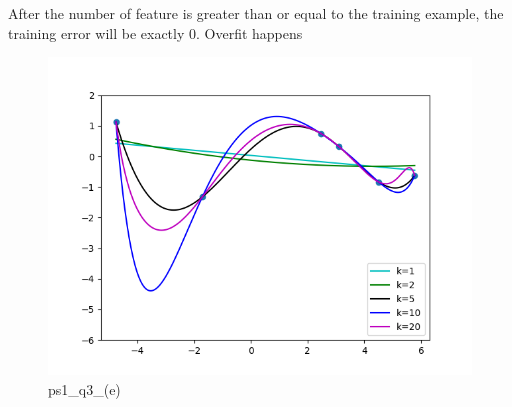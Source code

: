 \begin{answer}

After the number of feature is greater than or equal to the training example, the training error will be exactly 0. Overfit happens 
\begin{figure}[H]
    \centering
    \includegraphics[width=0.5\linewidth]{ps1_q3_(e).png}
    \caption{ps1\_q3\_(e)}
    \label{fig:enter-label}
\end{figure}
\end{answer}
